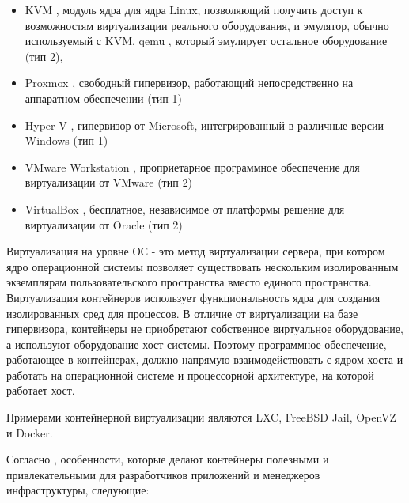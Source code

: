 \begin{itemize}
    \item KVM \cite{KVM}, модуль ядра для ядра Linux, позволяющий получить доступ к возможностям виртуализации реального оборудования, и эмулятор, обычно используемый с KVM, qemu \cite{qemu}, который эмулирует остальное оборудование (тип 2),
    \item Proxmox \cite{proxmox}, свободный гипервизор, работающий непосредственно на аппаратном обеспечении (тип 1)
    \item Hyper-V \cite{Hyper-V}, гипервизор от Microsoft, интегрированный в различные версии Windows (тип 1)
    \item VMware Workstation \cite{VMware}, проприетарное программное обеспечение для виртуализации от VMware (тип 2)
    \item VirtualBox \cite{VirtualBox}, бесплатное, независимое от платформы решение для виртуализации от Oracle (тип 2)
\end{itemize}


Виртуализация на уровне ОС - это метод виртуализации сервера, при котором ядро операционной системы позволяет существовать нескольким изолированным экземплярам пользовательского пространства вместо единого пространства. Виртуализация контейнеров использует функциональность ядра для создания изолированных сред для процессов. В отличие от виртуализации на базе гипервизора, контейнеры не приобретают собственное виртуальное оборудование, а используют оборудование хост-системы. Поэтому программное обеспечение, работающее в контейнерах, должно напрямую взаимодействовать с ядром хоста и работать на операционной системе и процессорной архитектуре, на которой работает хост.

Примерами контейнерной виртуализации являются LXC, FreeBSD Jail, OpenVZ и Docker.

Согласно \cite{alapati2016modern}, особенности, которые делают контейнеры полезными и привлекательными для разработчиков приложений и менеджеров инфраструктуры, следующие: 

